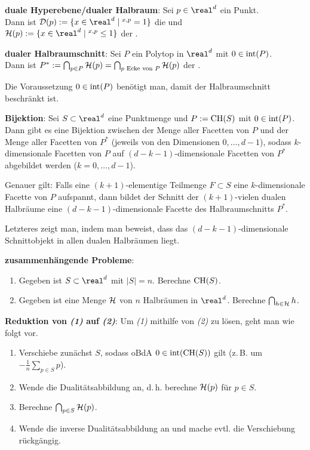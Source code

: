 \linie

\textbf{duale Hyperebene/dualer Halbraum}:
Sei $p \in \real^d$ ein Punkt.\\
Dann ist $\D(p) := \{x \in \real^d \;|\; \sp{x, p} = 1\}$ die  und\\
$\H(p) := \{x \in \real^d \;|\; \sp{x, p} \le 1\}$ der .

\textbf{dualer Halbraumschnitt}:
Sei $P$ ein Polytop in $\real^d$ mit $0 \in \operatorname{int}(P)$.\\
Dann ist $P^\ast := \bigcap_{p \in P} \mathcal{H}(p) = \bigcap_{\text{$p$ Ecke von $P$}} \mathcal{H}(p)$
der .

Die Voraussetzung $0 \in \operatorname{int}(P)$ benötigt man, damit der Halbraumschnitt beschränkt ist.

\linie

\textbf{Bijektion}:
Sei $S \subset \real^d$ eine Punktmenge und $P := \operatorname{CH}(S)$ mit $0 \in \operatorname{int}(P)$.\\
Dann gibt es eine Bijektion zwischen
der Menge aller Facetten von $P$ und
der Menge aller Facetten von $P^\ast$ (jeweils von den Dimensionen $0, \dotsc, d - 1$),
sodass $k$-dimensionale Facetten von $P$ auf $(d - k - 1)$-dimensionale Facetten von $P^\ast$
abgebildet werden ($k = 0, \dotsc, d - 1$).

Genauer gilt:
Falls eine $(k + 1)$-elementige Teilmenge $F \subset S$ eine $k$-dimensionale Facette
von $P$ aufspannt,
dann bildet der Schnitt der $(k + 1)$-vielen dualen Halbräume eine $(d - k - 1)$-dimensionale
Facette des Halbraumschnitts $P^\ast$.

Letzteres zeigt man, indem man beweist, dass das $(d - k - 1)$-dimensionale Schnittobjekt in
allen dualen Halbräumen liegt.

\linie

\textbf{zusammenhängende Probleme}:
\begin{enumerate}
    \item
    Gegeben ist $S \subset \real^d$ mit $|S| = n$.
    Berechne $\operatorname{CH}(S)$.

    \item
    Gegeben ist eine Menge $\mathcal{H}$ von $n$ Halbräumen in $\real^d$.
    Berechne $\bigcap_{h \in \mathcal{H}} h$.
\end{enumerate}

\textbf{Reduktion von \emph{(1)} auf \emph{(2)}}:
Um \emph{(1)} mithilfe von \emph{(2)} zu lösen, geht man wie folgt vor.
\begin{enumerate}
    \item
    Verschiebe zunächst $S$, sodass oBdA $0 \in \operatorname{int}(\operatorname{CH}(S))$ gilt
    (z.\,B. um $-\frac{1}{n} \sum_{p \in S} p$).

    \item
    Wende die Dualitätsabbildung an, d.\,h. berechne $\mathcal{H}(p)$ für $p \in S$.

    \item
    Berechne $\bigcap_{p \in S} \mathcal{H}(p)$.

    \item
    Wende die inverse Dualitätsabbildung an und mache evtl. die Verschiebung rückgängig.
\end{enumerate}

